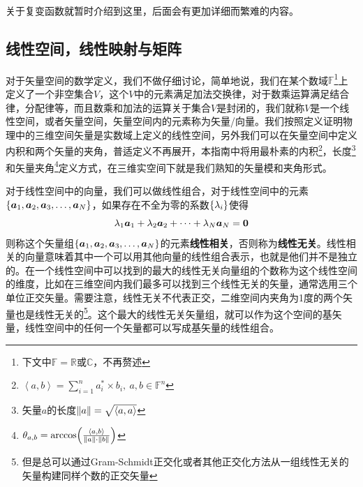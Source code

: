 \documentclass[12pt,a4paper,openany,twoside]{book}
\numberwithin{equation}{section}
\newcommand{\mean}[1]{\left\langle #1 \right\rangle}
\begin{document}
            关于复变函数就暂时介绍到这里，后面会有更加详细而繁难的内容。

          \subsection{线性空间，线性映射与矩阵}

            对于矢量空间的数学定义，我们不做仔细讨论，简单地说，我们在某个数域$\mathbb{F}$\footnote{下文中$\mathbb{F}=\mathbb{R}$或$\mathbb{C}$，不再赘述}上定义了一个非空集合$V$，这个$V$中的元素满足加法交换律，对于数乘运算满足结合律，分配律等，而且数乘和加法的运算关于集合$V$是封闭的，我们就称$V$是一个线性空间，或者矢量空间，矢量空间内的元素称为矢量/向量。我们按照定义证明物理中的三维空间矢量是实数域上定义的线性空间，另外我们可以在矢量空间中定义内积和两个矢量的夹角，普适定义不再展开，本指南中将用最朴素的内积\footnote{$\mean{a,b}=\sum_{i=1}^n{a_i^*\times b_i},\ a,b\in\mathbb{F}^n$}，长度\footnote{矢量$a$的长度$\norm{a}=\sqrt{\mean{a,a}}$}和矢量夹角\footnote{$\theta_{a,b}=\arccos(\frac{\mean{a,b}}{\norm{a}\cdot\norm{b}})$}定义方式，在三维实空间下就是我们熟知的矢量模和夹角形式。

            对于线性空间中的向量，我们可以做线性组合，对于线性空间中的元素$\qty{\vb*{a}_1,\vb*{a}_2,\vb*{a}_3,\dots,\vb*{a}_N}$，如果存在不全为零的系数$\qty{\lambda_i}$使得
            \begin{equation}
              \lambda_1\vb*{a}_1+\lambda_2\vb*{a}_2+\cdots+\lambda_N\vb*{a}_N=\vb*{0}
            \end{equation}
            则称这个矢量组$\qty{\vb*{a}_1,\vb*{a}_2,\vb*{a}_3,\dots,\vb*{a}_N}$的元素\textbf{线性相关}，否则称为\textbf{线性无关}。线性相关的向量意味着其中一个可以用其他向量的线性组合表示，也就是他们并不是独立的。在一个线性空间中可以找到的最大的线性无关向量组的个数称为这个线性空间的维度，比如在三维空间内我们最多可以找到三个线性无关的矢量，通常选用三个单位正交矢量。需要注意，线性无关不代表正交，二维空间内夹角为1度的两个矢量也是线性无关的\footnote{但是总可以通过Gram-Schmidt正交化或者其他正交化方法从一组线性无关的矢量构建同样个数的正交矢量}。这个最大的线性无关矢量组，就可以作为这个空间的基矢量，线性空间中的任何一个矢量都可以写成基矢量的线性组合。
            
\end{document}

